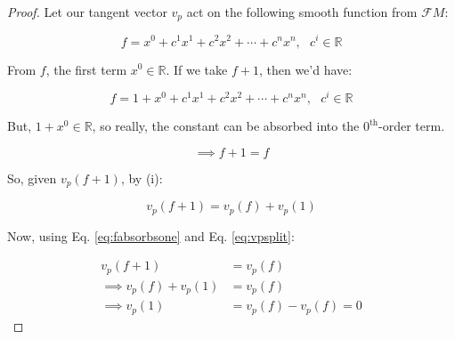 \documentclass{article}
\begin{document}
\begin{proof}[Proof]

Let our tangent vector \(v_p\) act on the following smooth function from \(\mathcal{F}M\):

\begin{equation*}
    f = x^0 + c^1 x^1 + c^2 x^2 + \cdots + c^n x^n, ~~~ c^i \in \mathbb{R}
\end{equation*}

\noindent
From \(f\), the first term \(x^0 \in \mathbb{R}\). If we take \(f+1\), then we'd have:

\begin{equation*}
    f = 1 + x^0 + c^1 x^1 + c^2 x^2 + \cdots + c^n x^n, ~~~ c^i \in \mathbb{R}
\end{equation*}

\noindent
But, \(1+x^0 \in \mathbb{R}\), so really, the constant can be absorbed into the \(0^{\text{th}}\)-order term.

\begin{equation}
    \implies f + 1 = f
    \label{eq:fabsorbsone}
\end{equation}

\noindent
So, given \(v_p(f+1)\), by (i):

\begin{equation}
    v_p(f + 1) = v_p(f) + v_p(1)
    \label{eq:vpsplit}
\end{equation}

\noindent
Now, using Eq. \ref{eq:fabsorbsone} and Eq. \ref{eq:vpsplit}:

\begin{align*}
    v_p(f+1) &= v_p(f) \\
    \implies v_p(f) + v_p(1) &= v_p(f) \\
    \implies v_p(1) &= v_p(f) - v_p(f) = 0
\end{align*}

\end{proof}
\end{document}
